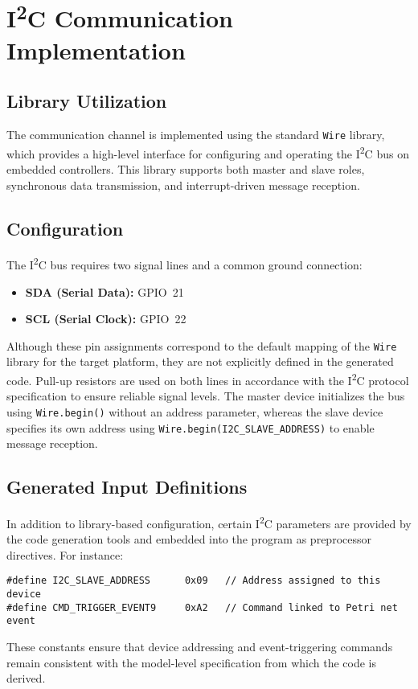
\section{I\textsuperscript{2}C Communication Implementation}
\label{sec:i2c_implementation}

\subsection{Library Utilization}
The communication channel is implemented using the standard \texttt{Wire} library, which provides a high-level interface for configuring and operating the I\textsuperscript{2}C bus on embedded controllers. This library supports both master and slave roles, synchronous data transmission, and interrupt-driven message reception.

\subsection{Configuration}
The I\textsuperscript{2}C bus requires two signal lines and a common ground connection:
\begin{itemize}
    \item \textbf{SDA (Serial Data):} GPIO~21
    \item \textbf{SCL (Serial Clock):} GPIO~22
\end{itemize}
Although these pin assignments correspond to the default mapping of the \texttt{Wire} library for the target platform, they are not explicitly defined in the generated code. Pull-up resistors are used on both lines in accordance with the I\textsuperscript{2}C protocol specification to ensure reliable signal levels. The master device initializes the bus using \texttt{Wire.begin()} without an address parameter, whereas the slave device specifies its own address using \texttt{Wire.begin(I2C\_SLAVE\_ADDRESS)} to enable message reception.

\subsection{Generated Input Definitions}
In addition to library-based configuration, certain I\textsuperscript{2}C parameters are provided by the code generation tools and embedded into the program as preprocessor directives. For instance:
\begin{verbatim}
#define I2C_SLAVE_ADDRESS      0x09   // Address assigned to this device
#define CMD_TRIGGER_EVENT9     0xA2   // Command linked to Petri net event
\end{verbatim}
These constants ensure that device addressing and event-triggering commands remain consistent with the model-level specification from which the code is derived.

